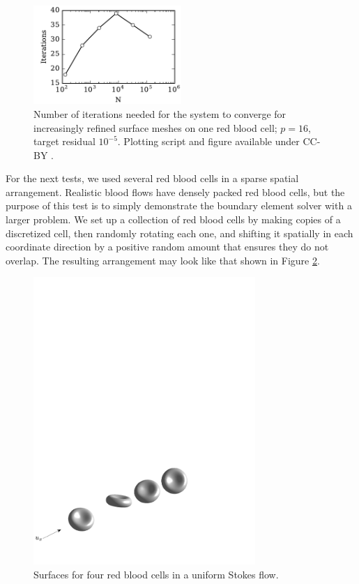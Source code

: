 \documentclass[final,3p,times]{elsarticle}
\begin{document}
\begin{figure}
\begin{center}
	\includegraphics[natwidth=3in,natheight=2in,width=0.5\textwidth]{EthrocyteSingleCellIterations.pdf}
	\caption{Number of iterations needed for the system to converge for increasingly refined surface meshes on one red blood cell; $p = 16$, target residual $10^{-5}$. Plotting script and figure available under CC-BY \cite{WangLaytonBarba2016-figshare4}.}
	\label{fig:single_cell_iterations}
\end{center}
\end{figure}


For the next tests, we used several red blood cells in a sparse spatial arrangement. Realistic blood flows have densely packed red blood cells, but the purpose of this test is to simply demonstrate the boundary element solver with a larger problem. We set up a collection of red blood cells by making copies of a discretized cell, then randomly rotating each one, and shifting it spatially in each  coordinate direction by a positive random amount that ensures they do not overlap. The resulting arrangement may look like that shown in Figure \ref{fig:multiple_cells}.


\begin{figure}[ht]
\begin{center}
\includegraphics[natwidth=6in,natheight=2.88in,width=0.75\textwidth]{4Cells_arrow.pdf}
	\caption{Surfaces for four red blood cells in a uniform Stokes flow.}
	\label{fig:multiple_cells}
\end{center}
\end{figure}
\end{document}
